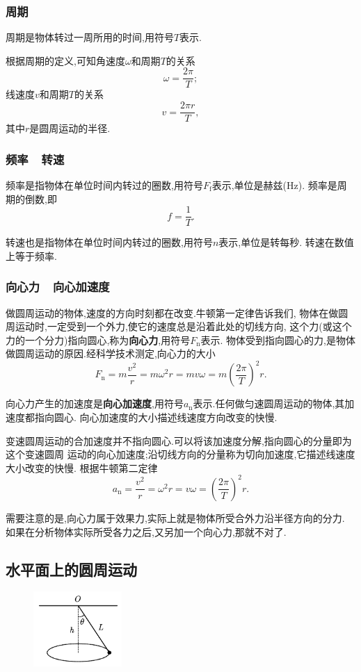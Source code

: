 \documentclass[11pt,a4paper]{ctexart}
\begin{document}
\subsubsection{周期}
周期是物体转过一周所用的时间,用符号$T$表示.

根据周期的定义,可知角速度$\omega$和周期$T$的关系 $$\omega=\frac{2\pi}{T};$$
线速度$v$和周期$T$的关系 $$v=\frac{2\pi r}{T}, $$其中$r$是圆周运动的半径.

\subsubsection{频率\ \ 转速}
频率是指物体在单位时间内转过的圈数,用符号$F_\mathrm{f}$表示,单位是赫兹(Hz).
频率是周期的倒数,即
$$f=\frac{1}{T}.$$

转速也是指物体在单位时间内转过的圈数,用符号$n$表示,单位是转每秒.
转速在数值上等于频率.

\subsubsection{向心力\ \ 向心加速度}
做圆周运动的物体,速度的方向时刻都在改变.牛顿第一定律告诉我们,
物体在做圆周运动时,一定受到一个外力,使它的速度总是沿着此处的切线方向,
这个力(或这个力的一个分力)指向圆心,称为\textbf{向心力},用符号$F_\mathrm{n}$表示.
物体受到指向圆心的力,是物体做圆周运动的原因.经科学技术测定,向心力的大小
$$F_\mathrm{n}=m\frac{v^2}{r}=m{\omega}^{2}r=mv\omega=m \left(\frac{2\pi}{T}\right)^2r.$$

向心力产生的加速度是\textbf{向心加速度},用符号$a_\mathrm{n}$表示.任何做匀速圆周运动的物体,其加速度都指向圆心.
向心加速度的大小描述线速度方向改变的快慢.

变速圆周运动的合加速度并不指向圆心.可以将该加速度分解,指向圆心的分量即为这个变速圆周
运动的向心加速度;沿切线方向的分量称为切向加速度,它描述线速度大小改变的快慢.
根据牛顿第二定律
$$a_\mathrm{n}=\frac{v^2}{r}={\omega}^{2}r=v\omega=\left(\frac{2\pi}{T}\right)^2r.$$

需要注意的是,向心力属于效果力,实际上就是物体所受合外力沿半径方向的分力.
如果在分析物体实际所受各力之后,又另加一个向心力,那就不对了.

\subsection{水平面上的圆周运动}

\begin{figure}
	\flushright
	\includegraphics[width=0.3\textwidth]{pic/pic8.pdf}
	\label{fig8}
\end{figure}
\end{document}
